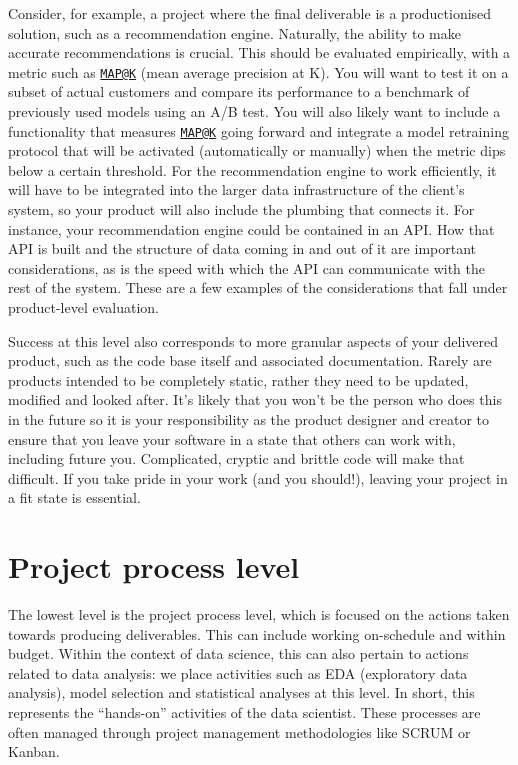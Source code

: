 \documentclass[
]{book}
\begin{document}
Consider, for example, a project where the final deliverable is a
productionised solution, such as a recommendation engine. Naturally, the
ability to make accurate recommendations is crucial. This should be
evaluated empirically, with a metric such as
\href{mailto:MAP@K}{\nolinkurl{MAP@K}} (mean average precision at K).
You will want to test it on a subset of actual customers and compare its
performance to a benchmark of previously used models using an A/B test.
You will also likely want to include a functionality that measures
\href{mailto:MAP@K}{\nolinkurl{MAP@K}} going forward and integrate a
model retraining protocol that will be activated (automatically or
manually) when the metric dips below a certain threshold. For the
recommendation engine to work efficiently, it will have to be integrated
into the larger data infrastructure of the client's system, so your
product will also include the plumbing that connects it. For instance,
your recommendation engine could be contained in an API. How that API is
built and the structure of data coming in and out of it are important
considerations, as is the speed with which the API can communicate with
the rest of the system. These are a few examples of the considerations
that fall under product-level evaluation.

Success at this level also corresponds to more granular aspects of your
delivered product, such as the code base itself and associated
documentation. Rarely are products intended to be completely static,
rather they need to be updated, modified and looked after. It's likely
that you won't be the person who does this in the future so it is your
responsibility as the product designer and creator to ensure that you
leave your software in a state that others can work with, including
future you. Complicated, cryptic and brittle code will make that
difficult. If you take pride in your work (and you should!), leaving
your project in a fit state is essential.

\hypertarget{project-process-level}{%
\section{Project process level}\label{project-process-level}}

The lowest level is the project process level, which is focused on the
actions taken towards producing deliverables. This can include working
on-schedule and within budget. Within the context of data science, this
can also pertain to actions related to data analysis: we place
activities such as EDA (exploratory data analysis), model selection and
statistical analyses at this level. In short, this represents the
``hands-on'' activities of the data scientist. These processes are often
managed through project management methodologies like SCRUM or Kanban.
\end{document}
